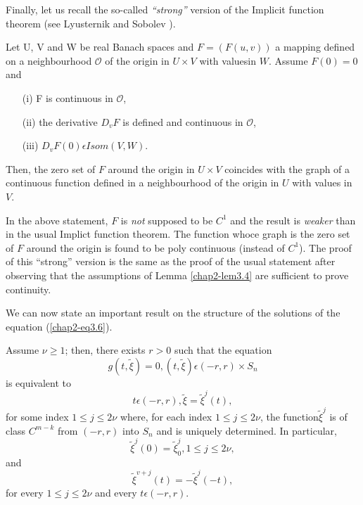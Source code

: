 Finally, let us recall the so-called {\em ``strong''} version of the
Implicit function theorem (see Lyusternik and Sobolev \cite{22}).

\begin{lemma}\label{chap2-lem3.4}
Let U, V and W be real Banach spaces and $F = (F(u, v))$ a mapping
defined on a neighbourhood $\mathscr{O}$ of the origin in $U \times V$
with values\pageoriginale in $W$. Assume $F(0) = 0$ and
\begin{enumerate}
\item[(i)] F is continuous in $\mathscr{O}$,

\item[(ii)] the derivative $D_{v}F$ is defined and continuous in
  $\mathscr{O}$,

\item[(iii)] $D_{v}F(0) \epsilon Isom (V, W)$.
\end{enumerate}

Then, the zero set of $F$ around the origin in $U \times V$ coincides
with the graph of a continuous function defined in a neighbourhood of
the origin in $U$ with values in $V$.
\end{lemma}

\begin{remark}\label{chap2-rem3.2}
In the above statement, $F$ is {\em not} supposed to be $C^{1}$ and the
result is {\em weaker} than in the usual Implict function theorem. The
function whoce graph is the zero set of $F$ around the origin is found
to be poly continuous (instead of $C^{1}$). The proof of this
``strong'' version is the same as the proof of the usual statement
after observing that the assumptions of Lemma \ref{chap2-lem3.4} are
sufficient to prove continuity.
\end{remark}

We can now state an important result on the structure of the solutions
of the equation (\ref{chap2-eq3.6}).

\begin{theorem}\label{chap2-thm3.1}
Assume $\nu \geq 1$; then, there exists $r > 0$ such that the equation
$$
g(t,\widetilde{\xi}) = 0, (t, \widetilde{\xi}) \epsilon (-r, r) \times S_{n}
$$
is equivalent to
$$
t \epsilon (-r, r), \widetilde{\xi} = \widetilde{\xi}^{j} (t),
$$
for some index $1 \leq j \leq 2\nu$ where, for each index $1 \leq j
\leq 2\nu$, the function\pageoriginale $\widetilde{\xi}^{j}$ is of class $C^{m-k}$
from $(-r, r)$ into $S_{n}$ and is uniquely determined. In particular,
$$
\widetilde{\xi}^{j}(0) = \widetilde{\xi}_{0}^{j}, 1 \leq j \leq 2\nu,
$$
and
$$
\widetilde{\xi}^{v+j}(t) = -\widetilde{\xi}^{j} (-t),
$$
for every $1 \leq j \leq 2\nu$ and every $t \epsilon (-r, r)$.
\end{theorem}

